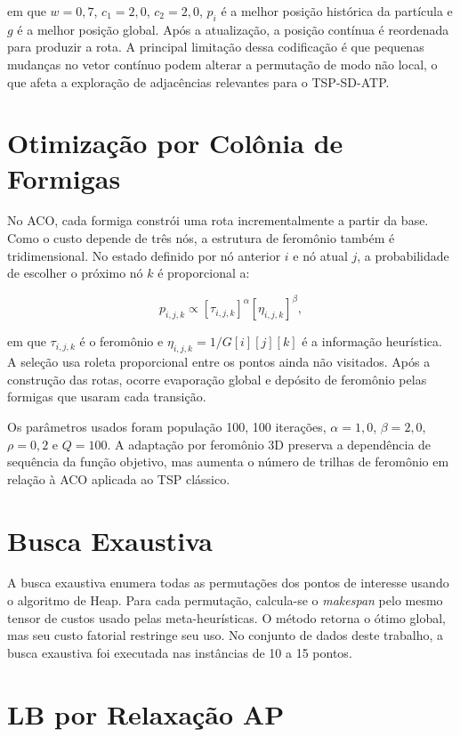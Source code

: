 em que $w=0{,}7$, $c_1=2{,}0$, $c_2=2{,}0$, $p_i$ é a melhor posição histórica da partícula e $g$ é a melhor posição global. Após a atualização, a posição contínua é reordenada para produzir a rota. A principal limitação dessa codificação é que pequenas mudanças no vetor contínuo podem alterar a permutação de modo não local, o que afeta a exploração de adjacências relevantes para o \ac{TSP-SD-ATP}.

\section{Otimização por Colônia de Formigas}

No \ac{ACO}, cada formiga constrói uma rota incrementalmente a partir da base. Como o custo depende de três nós, a estrutura de feromônio também é tridimensional. No estado definido por nó anterior $i$ e nó atual $j$, a probabilidade de escolher o próximo nó $k$ é proporcional a:

\begin{equation}
p_{i,j,k} \propto [\tau_{i,j,k}]^{\alpha}[\eta_{i,j,k}]^{\beta},
\label{eq:aco}
\end{equation}

em que $\tau_{i,j,k}$ é o feromônio e $\eta_{i,j,k}=1/G[i][j][k]$ é a informação heurística. A seleção usa roleta proporcional entre os pontos ainda não visitados. Após a construção das rotas, ocorre evaporação global e depósito de feromônio pelas formigas que usaram cada transição.

Os parâmetros usados foram população 100, 100 iterações, $\alpha=1{,}0$, $\beta=2{,}0$, $\rho=0{,}2$ e $Q=100$. A adaptação por feromônio 3D preserva a dependência de sequência da função objetivo, mas aumenta o número de trilhas de feromônio em relação à \ac{ACO} aplicada ao \ac{TSP} clássico.

\section{Busca Exaustiva}

A busca exaustiva enumera todas as permutações dos pontos de interesse usando o algoritmo de Heap. Para cada permutação, calcula-se o \textit{makespan} pelo mesmo tensor de custos usado pelas meta-heurísticas. O método retorna o ótimo global, mas seu custo fatorial restringe seu uso. No conjunto de dados deste trabalho, a busca exaustiva foi executada nas \TotalInstanciasComOtimo{} instâncias de 10 a 15 pontos.

\section{\texorpdfstring{\ac{LB}}{Lower Bound} por Relaxação \texorpdfstring{\ac{AP}}{AP}}


